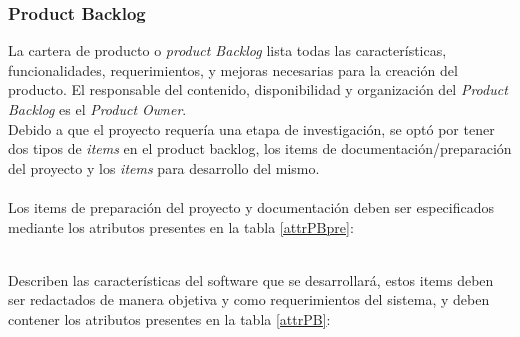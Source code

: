 \clearpage

\subsubsection{Product Backlog}

 La cartera de producto o {\it product Backlog} lista todas las características, funcionalidades, requerimientos,
 y mejoras necesarias para la creación del producto. El responsable del contenido, disponibilidad y organización
 del {\it Product Backlog} es el {\it Product Owner}.\\
       
 \noindent Debido a que el proyecto requería una etapa de investigación, se optó por tener dos tipos
 de {\it items} en el product backlog, los items de documentación/preparación del proyecto  y los {\it items}
 para desarrollo del mismo.\\
    
    \\
    Los items de preparación del proyecto y documentación deben ser especificados
    mediante los atributos presentes en la tabla \ref{attrPBpre}:
    


    \\
    Describen las características del software que se desarrollará, estos items deben
    ser redactados de manera objetiva y como requerimientos del sistema, y deben contener
    los atributos presentes en la tabla \ref{attrPB}:
    
